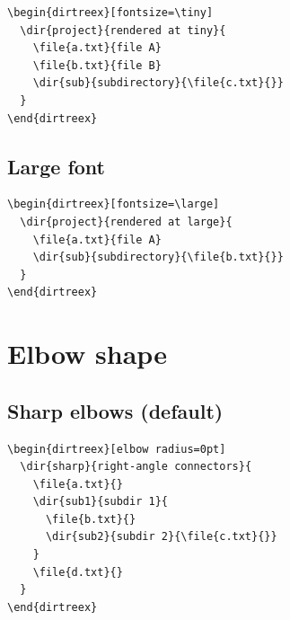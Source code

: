 \documentclass[11pt]{article}
\begin{document}
\begin{Verbatim}
\begin{dirtreex}[fontsize=\tiny]
  \dir{project}{rendered at tiny}{
    \file{a.txt}{file A}
    \file{b.txt}{file B}
    \dir{sub}{subdirectory}{\file{c.txt}{}}
  }
\end{dirtreex}
\end{Verbatim}

\begin{dirtreex}[fontsize=\tiny]
\end{dirtreex}

\subsection{Large font}

\begin{Verbatim}
\begin{dirtreex}[fontsize=\large]
  \dir{project}{rendered at large}{
    \file{a.txt}{file A}
    \dir{sub}{subdirectory}{\file{b.txt}{}}
  }
\end{dirtreex}
\end{Verbatim}

\begin{dirtreex}[fontsize=\large]
\end{dirtreex}

\clearpage

\section{Elbow shape}

\subsection{Sharp elbows (default)}

\begin{Verbatim}
\begin{dirtreex}[elbow radius=0pt]
  \dir{sharp}{right-angle connectors}{
    \file{a.txt}{}
    \dir{sub1}{subdir 1}{
      \file{b.txt}{}
      \dir{sub2}{subdir 2}{\file{c.txt}{}}
    }
    \file{d.txt}{}
  }
\end{dirtreex}
\end{Verbatim}
\end{document}
